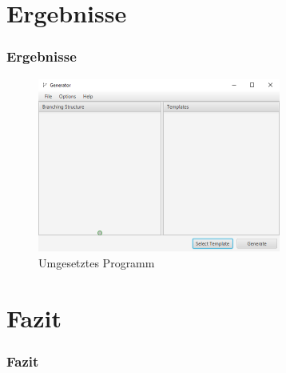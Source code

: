 \documentclass[12pt]{beamer}
\begin{document}
    \section{Ergebnisse}
    \label{sec:ergebnisse}
    \begin{frame}
        \frametitle{Ergebnisse}

        \begin{figure}
            \centering
            \includegraphics[width=8cm,cfbox=blue 0.4pt 1pt]{../images/UI.PNG}
            \caption{Umgesetztes Programm}
        \end{figure}
    \end{frame}

    \section{Fazit}
    \label{sec:fazit}
    \begin{frame}
        \frametitle{Fazit}

        
    \end{frame}
\end{document}
